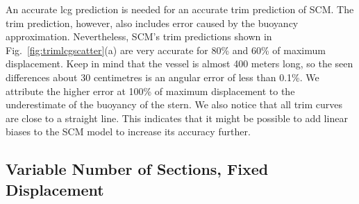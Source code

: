\documentclass[runningheads]{llncs}
\begin{document}
An accurate lcg prediction is needed for an accurate trim prediction of SCM. The trim prediction, however, also includes error caused by the buoyancy approximation. Nevertheless, SCM's trim predictions shown in Fig.~\ref{fig:trimlcgscatter}(a) are very accurate for 80\% and 60\% of maximum displacement. Keep in mind that the vessel is almost 400 meters long, so the seen differences about 30 centimetres is an angular error of less than 0.1\%. We attribute the higher error at 100\% of maximum displacement to the underestimate of the buoyancy of the stern. We also notice that all trim curves are close to a straight line. This indicates that it might be possible to add linear biases to the SCM model to increase its accuracy further. 
 

 
 
\subsection{Variable Number of Sections, Fixed Displacement}
\end{document}
